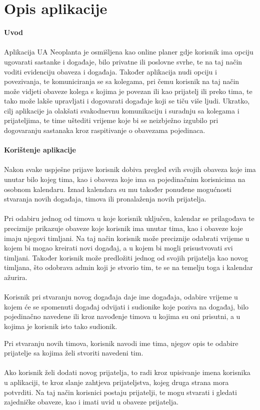 		\section{Opis aplikacije}

		\bigskip

		\noindent\textbf{Uvod}\\
		\\
		Aplikacija UA Neoplanta je osmišljena kao online planer gdje korisnik ima opciju ugovarati sastanke i događaje, bilo privatne ili poslovne svrhe, te na taj način voditi evidenciju obaveza i događaja. Također aplikacija nudi opciju i povezivanja, te komuniciranja se sa kolegama, pri čemu korisnik na taj način može vidjeti obaveze kolega s kojima je povezan ili kao prijatelj ili preko tima, te tako može lakše upravljati i dogovarati događaje koji se tiču više ljudi. Ukratko, cilj aplikacije ja olakšati svakodnevnu komunikaciju i suradnju sa kolegama i prijateljima, te time uštediti vrijeme koje bi se neizbježno izgubilo pri dogovaranju sastanaka kroz raspitivanje o obavezama pojedinaca.  \\
		\\

		\noindent\textbf{Korištenje aplikacije}\\
		\\
		Nakon svake uspješne prijave korisnik dobiva pregled svih svojih obaveza koje ima unutar bilo kojeg tima, kao i obaveza koje ima sa pojedinačnim korisnicima na osobnom kalendaru. Iznad kalendara su mu također ponuđene mogućnosti stvaranja novih događaja, timova ili pronalaženja novih prijatelja.  \\
		\\
		Pri odabiru jednog od timova u koje korisnik uključen, kalendar se prilagođava te preciznije prikazuje obaveze koje korisnik ima unutar tima, kao i obaveze koje imaju njegovi timljani. Na taj način korisnik može preciznije odabrati vrijeme u kojem bi mogao kreirati novi događaj, a u kojem bi mogli prisustvovati svi timljani. Također korisnik može predložiti jednog od svojih prijatelja kao novog timljana, što odobrava admin koji je stvorio tim, te se na temelju toga i kalendar ažurira.\\
		\\
		Korisnik pri stvaranju novog događaja daje ime događaja, odabire vrijeme u kojem će se spomenuti događaj odvijati i sudionike koje poziva na događaj, bilo pojedinačno navedene ili kroz navođenje timova u kojima su oni prisutni, a u kojima je korisnik isto tako sudionik. \\
		\pagebreak

		Pri stvaranju novih timova, korisnik navodi ime tima, njegov opis te odabire prijatelje sa kojima želi stvoriti navedeni tim.\\
		\\
		Ako korisnik želi dodati novog prijatelja, to radi kroz upisivanje imena korisnika u aplikaciji, te kroz slanje zahtjeva prijateljstva, kojeg druga strana mora potvrditi. Na taj način korisnici postaju prijatelji, te mogu stvarati i gledati zajedničke obaveze, kao i imati uvid u obaveze prijatelja.\\
		\pagebreak



		\eject
